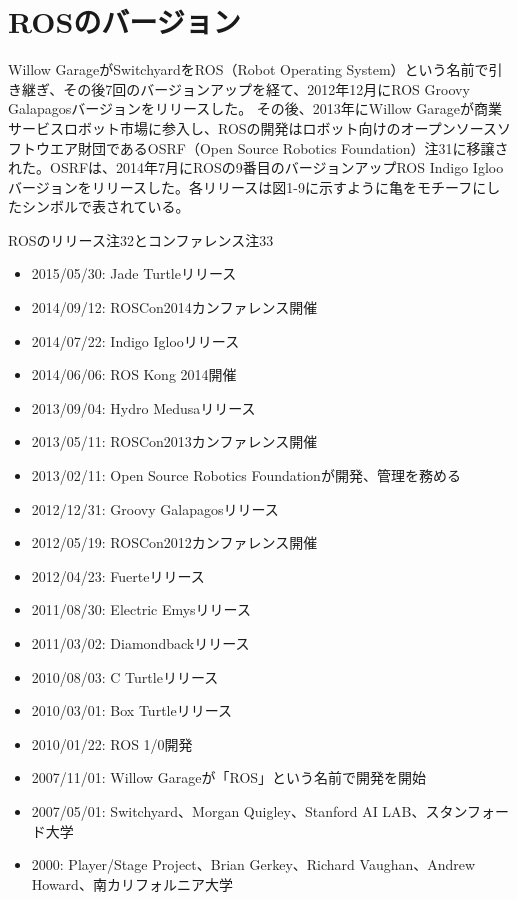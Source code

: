 \section{ROSのバージョン}

Willow GarageがSwitchyardをROS（Robot Operating System）という名前で引き継ぎ、その後7回のバージョンアップを経て、2012年12月にROS Groovy Galapagosバージョンをリリースした。
その後、2013年にWillow Garageが商業サービスロボット市場に参入し、ROSの開発はロボット向けのオープンソースソフトウエア財団であるOSRF（Open Source Robotics Foundation）注31に移譲された。OSRFは、2014年7月にROSの9番目のバージョンアップROS Indigo Iglooバージョンをリリースした。各リリースは図1-9に示すように亀をモチーフにしたシンボルで表されている。

ROSのリリース注32とコンファレンス注33
\begin{itemize}
\item  2015/05/30: Jade Turtleリリース
\item  2014/09/12: ROSCon2014カンファレンス開催
\item  2014/07/22: Indigo Iglooリリース
\item  2014/06/06: ROS Kong 2014開催
\item  2013/09/04: Hydro Medusaリリース
\item  2013/05/11: ROSCon2013カンファレンス開催
\item  2013/02/11: Open Source Robotics Foundationが開発、管理を務める
\item  2012/12/31: Groovy Galapagosリリース
\item  2012/05/19: ROSCon2012カンファレンス開催
\item  2012/04/23: Fuerteリリース
\item  2011/08/30: Electric Emysリリース
\item  2011/03/02: Diamondbackリリース
\item  2010/08/03: C Turtleリリース
\item  2010/03/01: Box Turtleリリース
\item  2010/01/22: ROS 1/0開発
\item  2007/11/01: Willow Garageが「ROS」という名前で開発を開始
\item  2007/05/01: Switchyard、Morgan Quigley、Stanford AI LAB、スタンフォード大学
\item  2000: Player/Stage Project、Brian Gerkey、Richard Vaughan、Andrew Howard、南カリフォルニア大学
\end{itemize}


